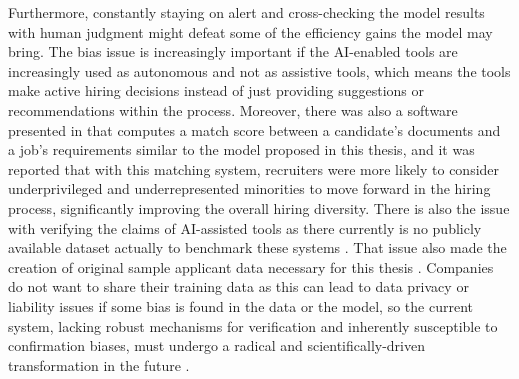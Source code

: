 \documentclass[draft,final]{thesisclass} %
\begin{document}
Furthermore, constantly staying on alert and cross-checking the model results with human judgment might defeat some of the efficiency gains the model may bring.
The bias issue is increasingly important if the \acs{AI}-enabled tools are increasingly used as autonomous and not as assistive tools, which means the tools make active hiring decisions instead of just providing suggestions or recommendations within the process.
Moreover, there was also a software presented in \textcite[10-11]{bias_ai_hiring} that computes a match score between a candidate's documents and a job's requirements similar to the model proposed in this thesis, and it was reported that with this matching system, recruiters were more likely to consider underprivileged and underrepresented minorities to move forward in the hiring process, significantly improving the overall hiring diversity.
There is also the issue with verifying the claims of \acs{AI}-assisted tools as there currently is no publicly available dataset actually to benchmark these systems \parencite[11]{bias_ai_hiring}. That issue also made the creation of original sample applicant data necessary for this thesis \parencite[11]{bias_ai_hiring}.
Companies do not want to share their training data as this can lead to data privacy or liability issues if some bias is found in the data or the model, so the current system, lacking robust mechanisms for verification and inherently susceptible to confirmation biases, must undergo a radical and scientifically-driven transformation in the future \parencite[11]{bias_ai_hiring}.
\end{document}
